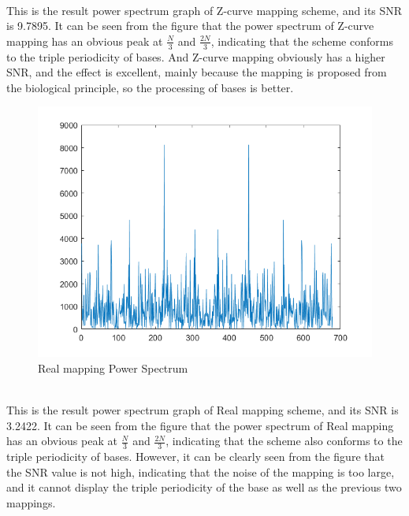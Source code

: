 \documentclass[conference]{IEEEtran}
\begin{document}
~\\ \indent This is the result power spectrum graph of Z-curve mapping scheme, and its SNR is 9.7895. It can be seen from the figure that the power spectrum of Z-curve mapping has an obvious peak at $\frac{N}{3}$ and $\frac{2N}{3}$, indicating that the scheme conforms to the triple periodicity of bases. And Z-curve mapping obviously has a higher SNR, and the effect is excellent, mainly because the mapping is proposed from the biological principle, so the processing of bases is better.
\begin{figure}[H]
    \centering
    \includegraphics[width=\linewidth]{realp.png}
    \caption{Real mapping Power Spectrum}
    \label{realp}
\end{figure}
~\\ \indent This is the result power spectrum graph of Real mapping scheme, and its SNR is 3.2422. It can be seen from the figure that the power spectrum of Real mapping has an obvious peak at $\frac{N}{3}$ and $\frac{2N}{3}$, indicating that the scheme also conforms to the triple periodicity of bases. However, it can be clearly seen from the figure that the SNR value is not high, indicating that the noise of the mapping is too large, and it cannot display the triple periodicity of the base as well as the previous two mappings.
\end{document}
